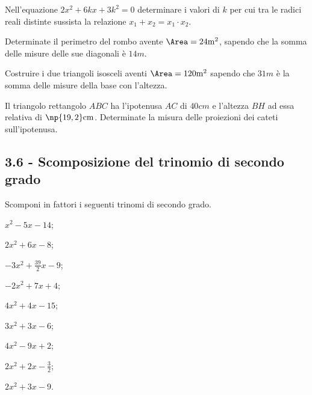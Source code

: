 \begin{esercizio}
 \label{ese:3.90}
Nell'equazione $2 x^{2} + 6 k x + 3 k^{2} = 0$ determinare i valori di $k$ per cui tra le radici reali distinte sussista la relazione $x_{1} + x_{2} = x_{1} \cdot x_{2}$.
\end{esercizio}

\begin{esercizio}
 \label{ese:3.91}
Determinate il perimetro del rombo avente $\Area = 24\unit{m^{2}}$, sapendo che la somma delle misure delle sue diagonali è $14\unit{m}$.
\end{esercizio}

\begin{esercizio}
\label{ese:3.92}
Costruire i due triangoli isosceli aventi $\Area = 120\unit{m^{2}}$ sapendo che $31\unit{m}$ è la somma delle misure della base con l'altezza.
\end{esercizio}

\begin{esercizio}
 \label{ese:3.93}
Il triangolo rettangolo $ABC$ ha l'ipotenusa $AC$ di $40\unit{cm}$ e l'altezza $BH$ ad essa relativa di $\np{19,2}\unit{cm}$. Determinate la misura delle proiezioni dei cateti sull'ipotenusa.
\end{esercizio}

\subsection*{3.6 - Scomposizione del trinomio di secondo grado}

\begin{esercizio}[\Ast]
 \label{ese:3.94}
Scomponi in fattori i seguenti trinomi di secondo grado.
\begin{multicols}{3}
\begin{enumeratea}
\item $x^{2}-5 x-14$;
\item $2 x^{2} + 6 x-8$;
\item $- 3 x^{2} + \frac{39}{2} x-9$;
\item $- 2 x^{2} + 7 x + 4$;
\item $4 x^{2} + 4 x-15$;
\item $3 x^{2} + 3 x-6$;
\item $4 x^{2}-9 x + 2$;
\item $2 x^{2} + 2 x - \frac{3}{2}$;
\item $2 x^{2}+3 x -9 $.
\end{enumeratea}
\end{multicols}
\end{esercizio}

